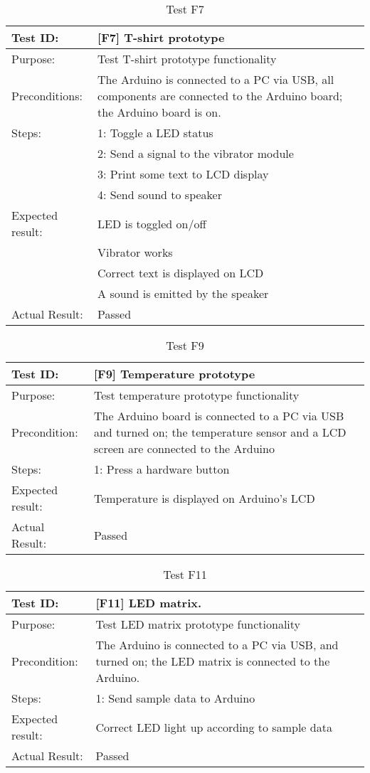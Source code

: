 \begin{table}[h!]
\begin{tabular}{|l|p{10cm}|}
\hline Test ID: &		[F7] T-shirt prototype \\
\hline Purpose: &		Test T-shirt prototype functionality \\
\hline Preconditions: & The Arduino is connected to a PC via USB, all components
						are connected to the Arduino board; the Arduino board is
						on.\\
\hline
Steps:
 & 1: Toggle a LED status \\
 & 2: Send a signal to the vibrator module \\
 & 3: Print some text to LCD display \\
 & 4: Send sound to speaker \\
\hline
Expected result:
 & LED is toggled on/off \\
 & Vibrator works \\
 & Correct text is displayed on LCD \\
 & A sound is emitted by the speaker \\
\hline
Actual Result:
 & Passed \\
\hline
\end{tabular}
\caption{Test F7}
\label{tbl:f7test}
\end{table}


\begin{table}[h!]
\begin{tabular}{|l|p{10cm}|}
\hline Test ID: &		[F9] Temperature prototype \\
\hline Purpose: &		Test temperature prototype functionality \\
\hline Precondition: &	The Arduino board is connected to a PC via USB and
						turned on; the temperature sensor and a LCD screen are
						connected to the Arduino \\
\hline
Steps:
 & 1: Press a hardware button \\
\hline
Expected result:
 & Temperature is displayed on Arduino's LCD \\
\hline
Actual Result:
 & Passed \\
\hline
\end{tabular}
\caption{Test F9}
\label{tbl:f9test}
\end{table}


\begin{table}[h!]
\begin{tabular}{|l|p{10cm}|}
\hline Test ID: &		[F11] LED matrix. \\
\hline Purpose: &		Test LED matrix prototype functionality \\
\hline Precondition: &	The Arduino is connected to a PC via USB, and turned on;
						the LED matrix is connected to the Arduino. \\
\hline
Steps:
 & 1: Send sample data to Arduino \\
\hline
Expected result:
 & Correct LED light up according to sample data \\
\hline
Actual Result:
 & Passed \\
\hline
\end{tabular}
\caption{Test F11}
\label{tbl:f11test}
\end{table}


